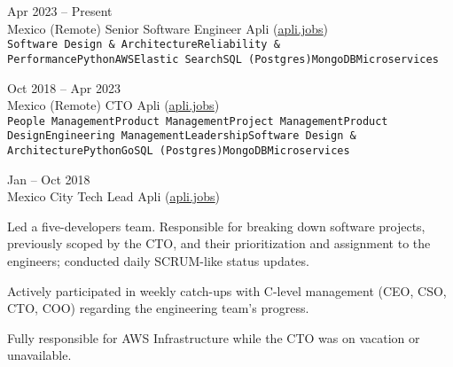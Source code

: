 \documentclass[9pt]{developercv} %
\begin{document}


\begin{entrylist}
    \entry
        {
            Apr 2023 -- Present
            \\\footnotesize{Mexico (Remote)}
        }
        {Senior Software Engineer}
        {Apli ({\href{https://apli.jobs/}{\underline{apli.jobs}}})}
        {
            \lorem \lorem\\

            \texttt{Software Design \& Architecture}\slashsep\texttt{Reliability \& Performance}\slashsep\texttt{Python}\slashsep\texttt{AWS}\slashsep\texttt{Elastic Search}\slashsep\texttt{SQL (Postgres)}\slashsep\texttt{MongoDB}\slashsep\texttt{Microservices}
        }

    \entry
        {Oct 2018 -- Apr 2023\\\footnotesize{Mexico (Remote)}}
        {CTO}
        {Apli ({\href{https://apli.jobs/}{\underline{apli.jobs}}})}
        {
            \lorem \lorem\\

            \texttt{People Management}\slashsep\texttt{Product Management}\slashsep\texttt{Project Management}\slashsep\texttt{Product Design}\slashsep\texttt{Engineering Management}\slashsep\texttt{Leadership}\slashsep\texttt{Software Design \& Architecture}\slashsep\texttt{Python}\slashsep\texttt{Go}\slashsep\texttt{SQL (Postgres)}\slashsep\texttt{MongoDB}\slashsep\texttt{Microservices}
        }

    \entry
        {
            Jan -- Oct 2018
            \\\footnotesize{Mexico City}
        }
        {Tech Lead}
        {Apli ({\href{https://apli.jobs/}{\underline{apli.jobs}}})}
        {

            Led a five-developers team. Responsible for breaking down software projects, previously scoped by the CTO, and their prioritization and assignment to the engineers; conducted daily SCRUM-like status updates. 

            Actively participated in weekly catch-ups with C-level management (CEO, CSO, CTO, COO) regarding the engineering team's progress.

            Fully responsible for AWS Infrastructure while the CTO was on vacation or unavailable.

}
\end{entrylist}
\end{document}
